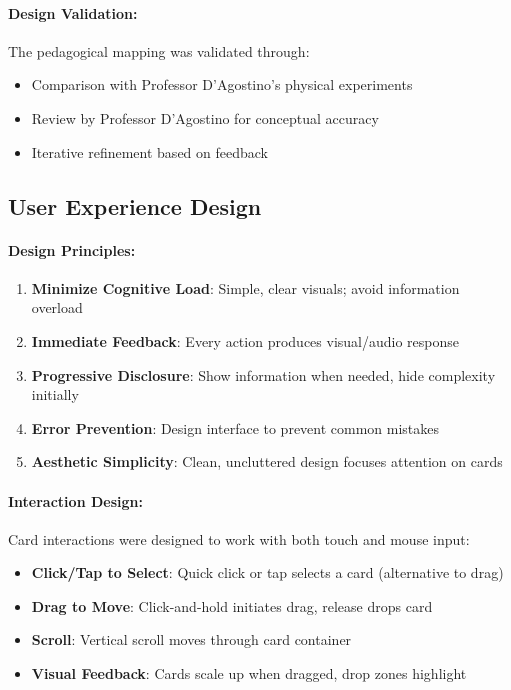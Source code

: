 \paragraph*{Design Validation:}

The pedagogical mapping was validated through:
\begin{itemize}
    \item Comparison with Professor D'Agostino's physical experiments
    \item Review by Professor D'Agostino for conceptual accuracy
    \item Iterative refinement based on feedback
\end{itemize}

\subsection{User Experience Design}
\label{subsec:ux-design}

\paragraph*{Design Principles:}

\begin{enumerate}
    \item \textbf{Minimize Cognitive Load}: Simple, clear visuals; avoid information overload
    \item \textbf{Immediate Feedback}: Every action produces visual/audio response
    \item \textbf{Progressive Disclosure}: Show information when needed, hide complexity initially
    \item \textbf{Error Prevention}: Design interface to prevent common mistakes
    \item \textbf{Aesthetic Simplicity}: Clean, uncluttered design focuses attention on cards
\end{enumerate}

\paragraph*{Interaction Design:}

Card interactions were designed to work with both touch and mouse input:

\begin{itemize}
    \item \textbf{Click/Tap to Select}: Quick click or tap selects a card (alternative to drag)
    \item \textbf{Drag to Move}: Click-and-hold initiates drag, release drops card
    \item \textbf{Scroll}: Vertical scroll moves through card container
    \item \textbf{Visual Feedback}: Cards scale up when dragged, drop zones highlight
\end{itemize}

